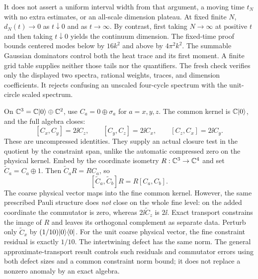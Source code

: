 It does not assert a uniform interval width from that argument, a moving time $t_N$ with no extra estimates, or an all-scale dimension plateau. At fixed finite $N$, $d_N(t)\to0$ as $t\downarrow0$ and as $t\to\infty$. By contrast, first taking $N\to\infty$ at positive $t$ and then taking $t\downarrow0$ yields the continuum dimension.
The fixed-time proof bounds centered modes below by $16k^2$ and above by $4\pi^2k^2$. The summable Gaussian dominators control both the heat trace and its first moment. A finite grid table supplies neither those tails nor the quantifiers. The fresh check verifies only the displayed two spectra, rational weights, traces, and dimension coefficients. It rejects confusing an unscaled four-cycle spectrum with the unit-circle scaled spectrum.

On $\mathbb C^3=\mathbb C\lvert 0\rangle\oplus\mathbb C^2$, use $C_a=0\oplus\sigma_a$ for $a=x,y,z$. The common kernel is $\mathbb C\lvert 0\rangle$, and the full algebra closes:
\[
[C_x,C_y]=2\ii C_z,\qquad[C_y,C_z]=2\ii C_x,\qquad[C_z,C_x]=2\ii C_y.
\]
These are uncompressed identities. They supply an actual closure test in the quotient by the constraint span, unlike the automatic compressed zero on the physical kernel.
Embed by the coordinate isometry $R:\mathbb C^3\to\mathbb C^4$ and set $\widetilde C_a=C_a\oplus1$. Then $\widetilde C_aR=RC_a$, so
\[
[\widetilde C_a,\widetilde C_b]R=R[C_a,C_b].
\]
The coarse physical vector maps into the fine common kernel. However, the same prescribed Pauli structure does \emph{not} close on the whole fine level: on the added coordinate the commutator is zero, whereas $2\ii\widetilde C_z$ is $2\ii$. Exact transport constrains the image of $R$ and leaves its orthogonal complement as separate data.
Perturb only $\widetilde C_x$ by $(1/10)\lvert 0\rangle\langle 0\rvert$. For the unit coarse physical vector, the fine constraint residual is exactly $1/10$. The intertwining defect has the same norm. The general approximate-transport result controls such residuals and commutator errors using both defect sizes and a common constraint norm bound; it does not replace a nonzero anomaly by an exact algebra.

